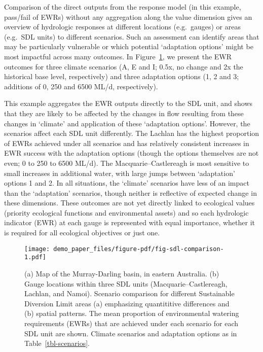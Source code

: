 \documentclass[
  number]{elsarticle}
\begin{document}
Comparison of the direct outputs from the response model (in this
example, pass/fail of EWRs) without any aggregation along the value
dimension gives an overview of hydrologic responses at different
locations (e.g.~gauges) or areas (e.g.~SDL units) to different
scenarios. Such an assessment can identify areas that may be
particularly vulnerable or which potential `adaptation options' might be
most impactful across many outcomes. In Figure~\ref{fig-sdl-comparison},
we present the EWR outcomes for three climate scenarios (A, E and I;
0.5x, no change and 2x the historical base level, respectively) and
three adaptation options (1, 2 and 3; additions of 0, 250 and 6500 ML/d,
respectively).

This example aggregates the EWR outputs directly to the SDL unit, and
shows that they are likely to be affected by the changes in flow
resulting from these changes in `climate' and application of these
`adaptation options'. However, the scenarios affect each SDL unit
differently. The Lachlan has the highest proportion of EWRs achieved
under all scenarios and has relatively consistent increases in EWR
success with the adaptation options (though the options themselves are
not even; 0 to 250 to 6500 ML/d). The Macquarie--Castlereagh is most
sensitive to small increases in additional water, with large jumps
between `adaptation' options 1 and 2. In all situations, the `climate'
scenarios have less of an impact than the `adaptation' scenarios, though
neither is reflective of expected change in these dimensions. These
outcomes are not yet directly linked to ecological values (priority
ecological functions and environmental assets) and so each hydrologic
indicator (EWR) at each gauge is represented with equal importance,
whether it is required for all ecological objectives or just one.

\begin{figure}

{\centering \texttt{[image: demo\_paper\_files/figure-pdf/fig-sdl-comparison-1.pdf]}

}

\caption{\label{fig-sdl-comparison}(a) Map of the Murray-Darling basin,
in eastern Australia. (b) Gauge locations within three SDL units
(Macquarie--Castlereagh, Lachlan, and Namoi). Scenario comparison for
different Sustainable Diversion Limit areas (a) emphasizing quantititive
differences and (b) spatial patterns. The mean proportion of
environmental watering requirements (EWRs) that are achieved under each
scenario for each SDL unit are shown. Climate scenarios and adaptation
options as in Table~\ref{tbl-scenarios}.}

\end{figure}
\end{document}
